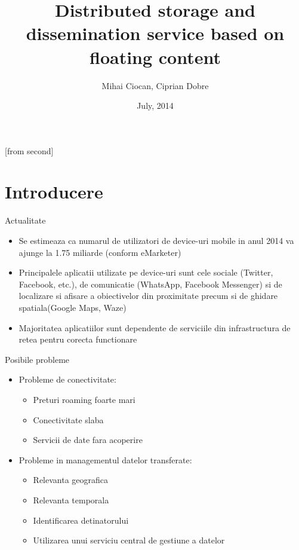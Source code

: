 \documentclass{beamer}
\title[Distributed storage and dissemination service based on floating
content]{Distributed storage and dissemination service based on floating
content}
\institute{Automatic Control and Computers Faculty,\\
	University Politehnica of Bucharest}
\author[Mihai Ciocan, Ciprian Dobre]{Mihai Ciocan, Ciprian Dobre}
\date{July, 2014}
\begin{document}
[from second]


\frame{\titlepage}

\frame{\tableofcontents}

\section{Introducere}

\begin{frame}{Actualitate}
	\begin{itemize}
		\item Se estimeaza ca numarul de utilizatori de device-uri mobile in anul
		2014 va ajunge la 1.75 miliarde (conform eMarketer)
		\item Principalele aplicatii utilizate pe device-uri sunt cele sociale
		(Twitter, Facebook, etc.), de comunicatie (WhatsApp, Facebook Messenger) si de
		localizare si afisare a obiectivelor din proximitate precum si de
		ghidare spatiala(Google Maps, Waze)
		\item Majoritatea aplicatiilor sunt dependente de serviciile din
		infrastructura de retea pentru corecta functionare
	\end{itemize}
\end{frame}

\begin{frame}{Posibile probleme}
	\begin{itemize}
	  \item Probleme de conectivitate:
	  \begin{itemize}
	    \item Preturi roaming foarte mari
	  	\item Conectivitate slaba
	  	\item Servicii de date fara acoperire
	  \end{itemize}
	  \item Probleme in managementul datelor transferate:
	  \begin{itemize}
	    \item Relevanta geografica
	    \item Relevanta temporala
	    \item Identificarea detinatorului
	    \item Utilizarea unui serviciu central de gestiune a datelor
	  \end{itemize}
	\end{itemize}
\end{frame}
\end{document}
